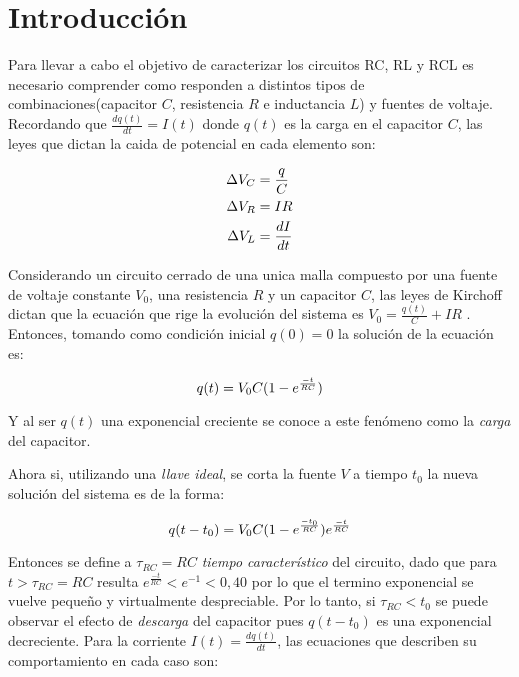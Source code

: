 \documentclass[11pt,a4paper]{article}
\begin{document}
\section{Introducción}\label{sec:intro}
Para llevar a cabo el objetivo de caracterizar los circuitos RC, RL y RCL es necesario comprender como responden a distintos tipos de combinaciones(capacitor $C$, resistencia $R$ e inductancia $L$) y fuentes de voltaje. Recordando que $\frac{dq(t)}{dt} = I(t)$ donde $q(t)$ es la carga en el capacitor $C$, las leyes que dictan la caida de potencial en cada elemento son:

\begin{equation}{\label{leyes}}
\begin{split}
\Delta V_C &= \frac{q}{C}\\
\Delta V_R &= IR\\
\Delta V_L &= \frac{dI}{dt}
\end{split}
\end{equation}

Considerando un circuito cerrado de una unica malla compuesto por una fuente de voltaje constante $V_{0}$, una resistencia $R$ y un capacitor $C$, las leyes de Kirchoff dictan que la ecuación que rige la evolución del sistema es $V_{0} = \frac{q(t)}{C}+IR$ \cite{Trelles}. Entonces, tomando como condición inicial $q(0)=0$ la solución de la ecuación es:
   
\begin{equation}{\label{RC_carga}}
q(t)=V_{0}C(1-e^\frac{-t}{RC})
\end{equation}

Y al ser $q(t)$ una exponencial creciente se conoce a este fenómeno como la \textit{carga} del capacitor.

Ahora si, utilizando una \textit{llave ideal}, se corta la fuente $V$ a tiempo $t_{0}$ la nueva solución del sistema es de la forma:

\begin{equation}{\label{RC_descarga}}
q(t-t_{0})=V_{0}C(1-e^\frac{-t_{0}}{RC})e^\frac{-t}{RC}
\end{equation}

Entonces se define a $\tau_{RC}=RC$ \textit{tiempo característico} del circuito, dado que para $t>\tau_{RC}=RC$ resulta $e^\frac{-t}{RC}<e^{-1}<0,40$ por lo que el termino exponencial se vuelve pequeño y virtualmente despreciable. Por lo tanto, si $\tau_{RC}<t_{0}$ se puede observar el efecto de \textit{descarga} del capacitor pues $q(t-t_{0})$ es una exponencial decreciente. Para la corriente $I(t) = \frac{dq(t)}{dt}$, las ecuaciones que describen su comportamiento en cada caso son:
\end{document}

